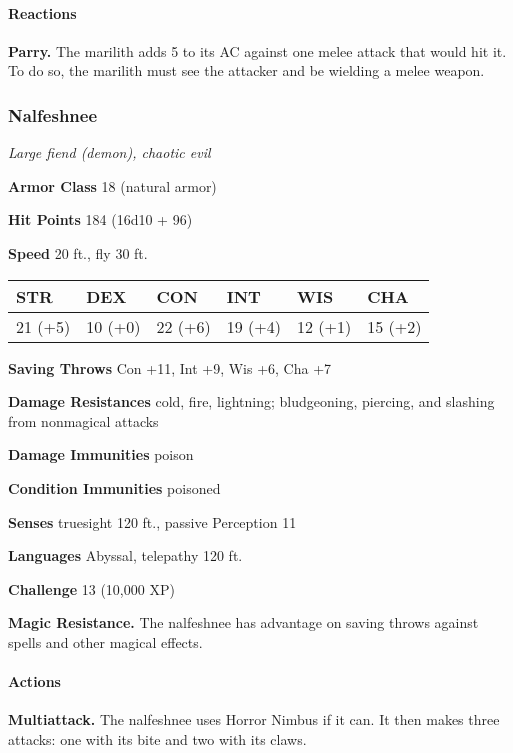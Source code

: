 \documentclass[
]{article}
\begin{document}
\hypertarget{reactions}{%
\paragraph{Reactions}\label{reactions}}

\textbf{Parry.} The marilith adds 5 to its AC against one melee attack
that would hit it. To do so, the marilith must see the attacker and be
wielding a melee weapon.

\hypertarget{nalfeshnee}{%
\subsubsection{Nalfeshnee}\label{nalfeshnee}}

\emph{Large fiend (demon), chaotic evil}

\textbf{Armor Class} 18 (natural armor)

\textbf{Hit Points} 184 (16d10 + 96)

\textbf{Speed} 20 ft., fly 30 ft.

\begin{longtable}[]{@{}llllll@{}}
\toprule
STR & DEX & CON & INT & WIS & CHA\tabularnewline
\midrule
\endhead
21 (+5) & 10 (+0) & 22 (+6) & 19 (+4) & 12 (+1) & 15 (+2)\tabularnewline
\bottomrule
\end{longtable}

\textbf{Saving Throws} Con +11, Int +9, Wis +6, Cha +7

\textbf{Damage Resistances} cold, fire, lightning; bludgeoning,
piercing, and slashing from nonmagical attacks

\textbf{Damage Immunities} poison

\textbf{Condition Immunities} poisoned

\textbf{Senses} truesight 120 ft., passive Perception 11

\textbf{Languages} Abyssal, telepathy 120 ft.

\textbf{Challenge} 13 (10,000 XP)

\textbf{Magic Resistance.} The nalfeshnee has advantage on saving throws
against spells and other magical effects.

\hypertarget{actions-6}{%
\paragraph{Actions}\label{actions-6}}

\textbf{Multiattack.} The nalfeshnee uses Horror Nimbus if it can. It
then makes three attacks: one with its bite and two with its claws.
\end{document}
